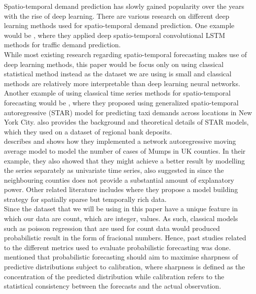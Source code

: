 \documentclass[nonblindrev,msom]{informs3} %
\begin{document}
\noindent Spatio-temporal demand prediction has slowly gained popularity over the years with the rise of deep learning. There are various research on different deep learning methods used for spatio-temporal demand prediction. One example would be \cite{Wang2018}, where they applied deep spatio-temporal convolutional LSTM methods for traffic demand prediction. \\

\noindent While most existing research regarding spatio-temporal forecasting makes use of deep learning methods, this paper would be focus only on using classical statistical method instead as the dataset we are using is small and classical methods are relatively more interpretable than deep learning neural networks. Another example of using classical time series methods for spatio-temporal forecasting would be \cite{Abolfazl2017}, where they proposed using generalized spatio-temporal autoregressive (STAR) model for predicting taxi demands across locations in New York City. \cite{KURT20152537} also provides the background and theoretical details of STAR models, which they used on a dataset of regional bank deposits. \\

\noindent \cite{Marina2016} describes and shows how they implemented a network autoregressive moving average model to model the number of cases of Mumps in UK counties. In their example, they also showed that they might achieve a better result by modelling the series separately as univariate time series, also suggested in \cite{Nunes2015} since the neighbouring counties does not provide a substantial amount of explanatory power.  Other related literature includes \cite{Xavier2005} where they propose a model building strategy for spatially sparse but temporally rich data. \\

\noindent Since the dataset that we will be using in this paper have a unique feature in which our data are count, which are integer, values. As such, classical models such as poisson regression that are used for count data would produced probabilistic result in the form of fracional numbers. Hence, past studies related to the different metrics used to evaluate probabilistic forecasting was done. \cite{Czado2009PredictiveMA} mentioned that probabilistic forecasting should aim to maximise sharpness of predictive distributions subject to calibration, where sharpness is defined as the concentration of the predicted distribution while calibration refers to the statistical consistency between the forecasts and the actual observation. \\
\end{document}

